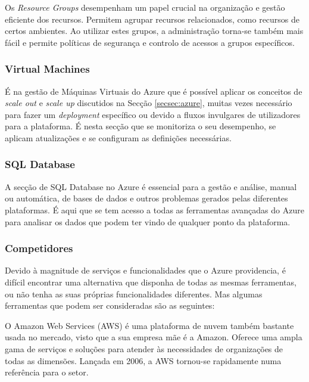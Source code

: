             Os \textit{Resource Groups} desempenham um papel crucial na organização e gestão eficiente dos recursos. Permitem agrupar recursos relacionados, como recursos de certos ambientes. Ao utilizar estes grupos, a administração torna-se também mais fácil e permite políticas de segurança e controlo de acessos a grupos específicos. 

        \subsubsection{Virtual Machines}

            É na gestão de Máquinas Virtuais do Azure que é possível aplicar os conceitos de \textit{scale out} e \textit{scale up} discutidos na Secção \ref{secsec:azure}, muitas vezes necessário para fazer um \textit{deployment} específico ou devido a fluxos invulgares de utilizadores para a plataforma. É nesta secção que se monitoriza o seu desempenho, se aplicam atualizações e se configuram as definições necessárias.

        \subsubsection{SQL Database} %

            A secção de SQL Database no Azure é essencial para a gestão e análise, manual ou automática, de bases de dados e outros problemas gerados pelas diferentes plataformas. É aqui que se tem acesso a todas as ferramentas avançadas do Azure para analisar os dados que podem ter vindo de qualquer ponto da plataforma.

        \subsubsection{Competidores}\label{competidores-azure}

            Devido à magnitude de serviços e funcionalidades que o Azure providencia, é difícil encontrar uma alternativa que disponha de todas as mesmas ferramentas, ou não tenha as suas próprias funcionalidades diferentes. Mas algumas ferramentas que podem ser consideradas são as seguintes:

            \label{competidores-aws}

                O Amazon Web Services (AWS) é uma plataforma de nuvem também bastante usada no mercado, visto que a sua empresa mãe é a Amazon. Oferece uma ampla gama de serviços e soluções para atender às necessidades de organizações de todas as dimensões. Lançada em 2006, a AWS tornou-se rapidamente numa referência para o setor.

